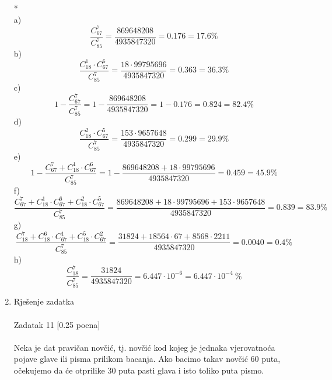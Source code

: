 \documentclass[12pt]{article}
\begin{document}
\begin{enumerate}
        * \\
        a)
        \begin{equation*}
        \frac{C^7_{67}}{C^7_{85}} = \frac{869648208}{4935847320} = 0.176 = 17.6\%
        \end{equation*}
        b)
        \begin{equation*}
        \frac{C^1_{18} \cdot C^6_{67}}{C^7_{85}} = \frac{18 \cdot 99795696}{4935847320} = 0.363 = 36.3\%
        \end{equation*}
		\newpage
		c)
        \begin{equation*}
        1 - \frac{C^7_{67}}{C^7_{85}} = 1 - \frac{869648208}{4935847320} = 1 -  0.176 = 0.824 = 82.4\%
        \end{equation*}
		d)
        \begin{equation*}
        \frac{C^2_{18} \cdot C^5_{67}}{C^7_{85}} = \frac{153 \cdot 9657648}{4935847320} = 0.299 = 29.9\%
        \end{equation*}
		e)
        \begin{equation*}
        1 - \frac{C^7_{67}+ C^1_{18} \cdot C^6_{67}}{C^7_{85}} = 1 - \frac{869648208 + 18 \cdot 99795696}{4935847320} = 0.459 = 45.9\%
        \end{equation*}
        f)
        \begin{equation*}
        \frac{C^7_{67}+ C^1_{18} \cdot C^6_{67} + C^2_{18} \cdot C^5_{67}}{C^7_{85}} = \frac{869648208 + 18 \cdot 99795696 + 153 \cdot 9657648}{4935847320} = 0.839 = 83.9\%
        \end{equation*}
        g)
        \begin{equation*}
        \frac{C^7_{18} + C^6_{18} \cdot C^1_{67} + C^5_{18} \cdot C^2_{67} }{C^7_{85}} = \frac{31824 + 18564 \cdot 67 + 8568 \cdot 2211}{4935847320} = 0.0040 = 0.4\%
        \end{equation*}
        h)
        \begin{equation*}
        \frac{C^7_{18}}{C^7_{85}} = \frac{31824}{4935847320} = 6.447 \cdot 10^{-6} = 6.447 \cdot 10^{-4}~\%
        \end{equation*}
		\item Rješenje zadatka \\
		\\
		Zadatak 11 [0.25 poena] \\
		\\
Neka je dat pravičan novčić, tj. novčić kod kojeg je jednaka vjerovatnoća
pojave glave ili pisma prilikom bacanja. Ako bacimo takav novčić 60 puta,
očekujemo da će otprilike 30 puta pasti glava i isto toliko puta pismo.

\end{enumerate}
\end{document}
